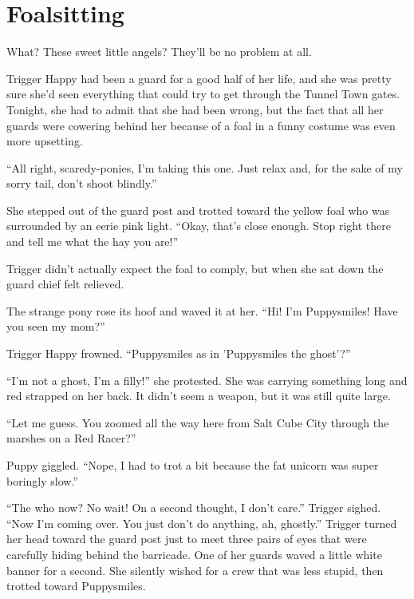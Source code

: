 
\chapter{Foalsitting}


\begin{intro}
What? These sweet little angels? They'll be no problem at all.
\end{intro}



Trigger Happy had been a guard for a good half of her life, and she was pretty sure she'd seen everything that could try to get through the Tunnel Town gates. Tonight, she had to admit that she had been wrong, but the fact that all her guards were cowering behind her because of a foal in a funny costume was even more upsetting.

``All right, scaredy-ponies, I'm taking this one. Just relax and, for the sake of my sorry tail, don't shoot blindly.''

She stepped out of the guard post and trotted toward the yellow foal who was surrounded by an eerie pink light. ``Okay, that's close enough. Stop right there and tell me what the hay you are!''

Trigger didn't actually expect the foal to comply, but when she sat down the guard chief felt relieved.

The strange pony rose its hoof and waved it at her. ``Hi! I'm Puppysmiles! Have you seen my mom?''

Trigger Happy frowned. ``Puppysmiles as in 'Puppysmiles the ghost'?''

``I'm not a ghost, I'm a filly!'' she protested. She was carrying something long and red strapped on her back. It didn't seem a weapon, but it was still quite large.

``Let me guess. You zoomed all the way here from Salt Cube City through the marshes on a Red Racer?''

Puppy giggled. ``Nope, I had to trot a bit because the fat unicorn was super boringly slow.''

``The who now? No wait! On a second thought, I don't care.'' Trigger sighed. ``Now I'm coming over. You just don't do anything, ah, ghostly.'' Trigger turned her head toward the guard post just to meet three pairs of eyes that were carefully hiding behind the barricade. One of her guards waved a little white banner for a second. She silently wished for a crew that was less stupid, then trotted toward Puppysmiles.

